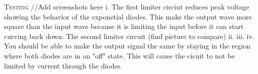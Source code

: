 \documentclass[9pt,a4paper]{report}
\begin{document}
	\textsc{Testing}
	\newline
	//Add screenshots here
	\newline
	\hspace*{.15in}
	i. The first limiter circiut reduces peak voltage showing the behavior of the exponetial diodes. This make the output wave more square than the input wave because it is limiting the input before it can start curving back down. The second limiter circuit (find picture to compare)
	\newline
	\hspace*{.15in} 
	ii.
	\newline
	\hspace*{.15in} 
	iii.
	\newline
	\hspace*{.15in} 
	iv. You should be able to make the output signal the same by staying in the region where both diodes are in an "off" state. This will cause the cicuit to not be limited by current through the diodes.
	\newline
	
	\vspace*{1.5in}
\end{document}
